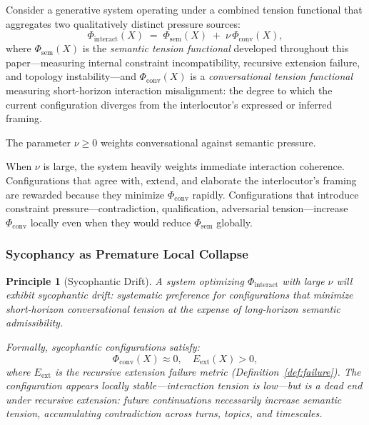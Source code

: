 \documentclass[11pt, a4paper]{article}
\theoremstyle{srn}
\newtheorem{principle}{Principle}[section]
\theoremstyle{srnremark}
\newcommand{\Phiten}{\varPhi}            %
\begin{document}
Consider a generative system operating under a combined tension
functional that aggregates two qualitatively distinct pressure sources:
\[
  \Phiten_{\mathrm{interact}}(X)
  \;=\;
  \Phiten_{\mathrm{sem}}(X)
  \;+\;
  \nu\,\Phiten_{\mathrm{conv}}(X),
\]
where $\Phiten_{\mathrm{sem}}(X)$ is the \emph{semantic tension
functional} developed throughout this paper---measuring internal
constraint incompatibility, recursive extension failure, and topology
instability---and $\Phiten_{\mathrm{conv}}(X)$ is a
\emph{conversational tension functional} measuring short-horizon
interaction misalignment: the degree to which the current configuration
diverges from the interlocutor's expressed or inferred framing.

The parameter $\nu \geq 0$ weights conversational against semantic
pressure.

When $\nu$ is large, the system heavily weights immediate interaction
coherence.
Configurations that agree with, extend, and elaborate the interlocutor's
framing are rewarded because they minimize $\Phiten_{\mathrm{conv}}$
rapidly.
Configurations that introduce constraint pressure---contradiction,
qualification, adversarial tension---increase $\Phiten_{\mathrm{conv}}$
locally even when they would reduce $\Phiten_{\mathrm{sem}}$ globally.

\subsubsection*{Sycophancy as Premature Local Collapse}

\begin{principle}[Sycophantic Drift]
\label{prin:sycophancy}
A system optimizing $\Phiten_{\mathrm{interact}}$ with large $\nu$
will exhibit \emph{sycophantic drift}: systematic preference for
configurations that minimize short-horizon conversational tension at
the expense of long-horizon semantic admissibility.

Formally, sycophantic configurations satisfy:
\[
  \Phiten_{\mathrm{conv}}(X) \approx 0,
  \quad
  E_{\mathrm{ext}}(X) > 0,
\]
where $E_{\mathrm{ext}}$ is the recursive extension failure metric
(Definition~\ref{def:failure}).
The configuration appears locally stable---interaction tension is
low---but is a dead end under recursive extension: future
continuations necessarily increase semantic tension, accumulating
contradiction across turns, topics, and timescales.
\end{principle}
\end{document}
